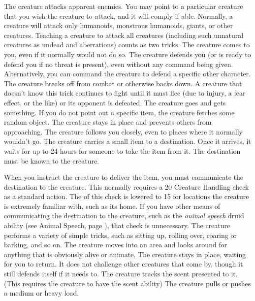          The creature attacks apparent enemies. You may point to a particular creature that you wish the creature to attack, and it will comply if able. Normally, a creature will attack only humanoids, monstrous humanoids, giants, or other creatures. Teaching a creature to attack all creatures (including such unnatural creatures as undead and aberrations) counts as two tricks.
         The creature comes to you, even if it normally would not do so.
         The creature defends you (or is ready to defend you if no threat is present), even without any command being given. Alternatively, you can command the creature to defend a specific other character.
         The creature breaks off from combat or otherwise backs down. A creature that doesn't know this trick continues to fight until it must flee (due to injury, a fear effect, or the like) or its opponent is defeated.
         The creature goes and gets something. If you do not point out a specific item, the creature fetches some random object.
         The creature stays in place and prevents others from approaching.
         The creature follows you closely, even to places where it normally wouldn't go.
         The creature carries a small item to a destination.
        Once it arrives, it waits for up to 24 hours for someone to take the item from it.
        The destination must be known to the creature.
        \par When you instruct the creature to deliver the item, you must communicate the destination to the creature.
        This normally requires a  20 Creature Handling check as a standard action.
        The  of this check is lowered to 15 for locations the creature is extremely familiar with, such as its home.
        If you have other means of communicating the destination to the creature, such as the \textit{animal speech} druid ability (see Animal Speech, page ), that check is unnecessary.
         The creature performs a variety of simple tricks, such as sitting up, rolling over, roaring or barking, and so on.
         The creature moves into an area and looks around for anything that is obviously alive or animate.
         The creature stays in place, waiting for you to return. It does not challenge other creatures that come by, though it still defends itself if it needs to.
         The creature tracks the scent presented to it. (This requires the creature to have the scent ability)
         The creature pulls or pushes a medium or heavy load.


